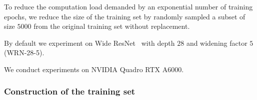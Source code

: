 To reduce the computation load demanded by an exponential number of training epochs, we reduce the size of the training set by randomly sampled a subset of size $5000$ from the original training set without replacement.

By default we experiment on Wide ResNet~\citep{Zagoruyko2016WideRN} with depth $28$ and widening factor $5$ (WRN-28-5).

We conduct experiments on 
NVIDIA Quadro RTX A6000.

\subsubsection{Construction of the training set}






